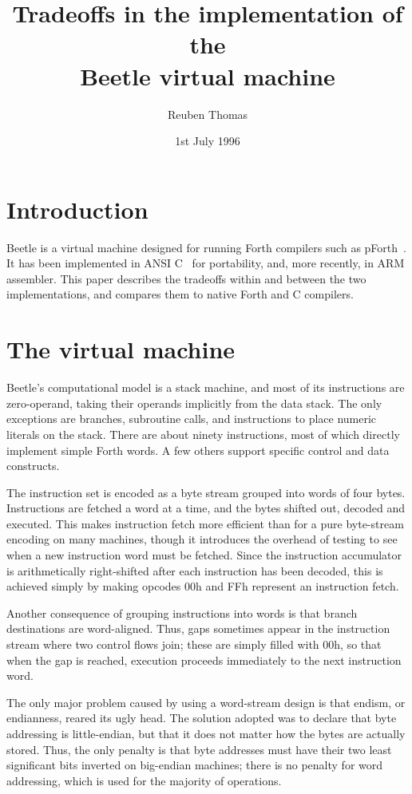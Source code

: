 \documentclass{article}
\title{Tradeoffs in the implementation of the\\Beetle virtual machine}
\author{Reuben Thomas}
\date{1st July 1996}
\begin{document}
\maketitle


\section{Introduction}

Beetle is a virtual machine designed for running Forth compilers such as
pForth~\cite{beetledis}. It has been implemented in ANSI C~\cite{beetledis} for
portability, and, more recently, in ARM assembler. This paper describes the
tradeoffs within and between the two implementations, and compares them to
native Forth and C compilers.


\section{The virtual machine}

Beetle's computational model is a stack machine, and most of its instructions
are zero-operand, taking their operands implicitly from the data stack. The
only exceptions are branches, subroutine calls, and instructions to place
numeric literals on the stack. There are about ninety instructions, most of
which directly implement simple Forth words. A few others support specific
control and data constructs.

The instruction set is encoded as a byte stream grouped into words of four
bytes. Instructions are fetched a word at a time, and the bytes shifted out,
decoded and executed. This makes instruction fetch more efficient than for a
pure byte-stream encoding on many machines, though it introduces the overhead
of testing to see when a new instruction word must be fetched. Since the
instruction accumulator is arithmetically right-shifted after each
instruction has been decoded, this is achieved simply by making opcodes 00h
and FFh represent an instruction fetch.

Another consequence of grouping instructions into words is that branch
destinations are word-aligned. Thus, gaps sometimes appear in the
instruction stream where two control flows join; these are simply filled with
00h, so that when the gap is reached, execution proceeds immediately to the
next instruction word.

The only major problem caused by using a word-stream design is that endism,
or endianness, reared its ugly head. The solution adopted was to declare that
byte addressing is little-endian, but that it does not matter how the bytes
are actually stored. Thus, the only penalty is that byte addresses must have
their two least significant bits inverted on big-endian machines; there is no
penalty for word addressing, which is used for the majority of operations.
\end{document}
